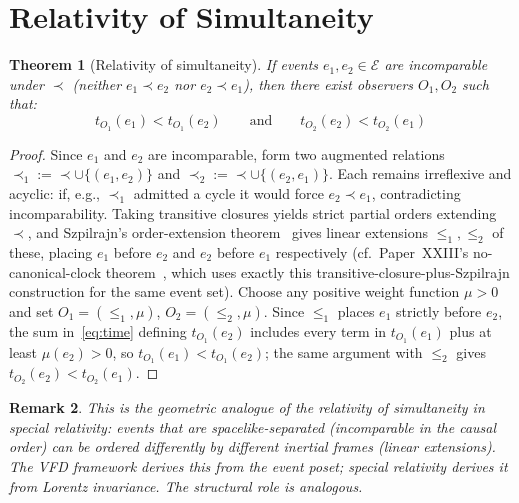 \documentclass[12pt]{article}
\newtheorem{theorem}{Theorem}
\newtheorem{remark}[theorem]{Remark}
\newcommand{\Ecal}{\mathcal{E}}
\begin{document}
\section{Relativity of Simultaneity}\label{sec:simultaneity}

\begin{theorem}[Relativity of simultaneity]\label{thm:simultaneity}
If events $e_1, e_2 \in \Ecal$ are incomparable under $\prec$ (neither $e_1 \prec e_2$ nor $e_2 \prec e_1$), then there exist observers $O_1, O_2$ such that:
\begin{equation}
    t_{O_1}(e_1) < t_{O_1}(e_2) \qquad\text{and}\qquad t_{O_2}(e_2) < t_{O_2}(e_1)
\end{equation}
\end{theorem}

\begin{proof}
Since $e_1$ and $e_2$ are incomparable, form two augmented relations $\prec_1 := \prec \cup \{(e_1,e_2)\}$ and $\prec_2 := \prec \cup \{(e_2,e_1)\}$. Each remains irreflexive and acyclic: if, e.g., $\prec_1$ admitted a cycle it would force $e_2 \prec e_1$, contradicting incomparability. Taking transitive closures yields strict partial orders extending $\prec$, and Szpilrajn's order-extension theorem~\citep{Szpilrajn1930} gives linear extensions $\leq_1,\leq_2$ of these, placing $e_1$ before $e_2$ and $e_2$ before $e_1$ respectively (cf.\ Paper~XXIII's no-canonical-clock theorem~\citep{SmartXXIII}, which uses exactly this transitive-closure-plus-Szpilrajn construction for the same event set). Choose any positive weight function $\mu > 0$ and set $O_1 = (\leq_1, \mu)$, $O_2 = (\leq_2, \mu)$. Since $\leq_1$ places $e_1$ strictly before $e_2$, the sum in~\eqref{eq:time} defining $t_{O_1}(e_2)$ includes every term in $t_{O_1}(e_1)$ plus at least $\mu(e_2) > 0$, so $t_{O_1}(e_1) < t_{O_1}(e_2)$; the same argument with $\leq_2$ gives $t_{O_2}(e_2) < t_{O_2}(e_1)$.
\end{proof}

\begin{remark}
This is the geometric analogue of the relativity of simultaneity in special relativity: events that are spacelike-separated (incomparable in the causal order) can be ordered differently by different inertial frames (linear extensions). The VFD framework derives this from the event poset; special relativity derives it from Lorentz invariance. The structural role is analogous.
\end{remark}
\end{document}
